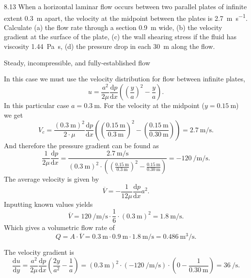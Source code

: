 \begin{problem}{8.13}
  When a horizontal laminar flow occurs between two parallel plates of infinite extent \qty{0,3}{\m} apart, the velocity at the midpoint between the plates is \qty{2,7}{\m\per\s}. Calculate (a) the flow rate through a section \qty{0,9}{\m} wide, (b) the velocity gradient at the surface of the plate, (c) the wall shearing stress if the fluid has viscosity \qty{1,44}{\Pa.\s}, (d) the pressure drop in each \qty{30}{\m} along the flow. 
\end{problem}

\begin{assumptions}
  \item Steady, incompressible, and fully-established flow
\end{assumptions}

\begin{derivation}
  In this case we must use the velocity distribution for flow between infinite plates,
  \[ 
  u = \frac{a^2}{2\mu} \frac{\mathrm{d}p}{\mathrm{d}x} \left( \left( \frac{y}{a} \right)^2 - \frac{y}{a} \right)
  .\]
  In this particular case $a = \qty{0,3}{\m}$.
  For the velocity at the midpoint ($y = \qty{0,15}{\m}$) we get
  \[ 
  V_c = \frac{\left( \qty{0,3}{\m}  \right)^2}{2 \cdot \mu} \frac{\mathrm{d}p}{\mathrm{d}x}  \left( \left( \frac{\qty{0,15}{\m} }{\qty{0,3}{\m} } \right)^2 - \left( \frac{\qty{0,15}{\m} }{\qty{0,30}{\m} } \right) \right) = \qty{2,7}{\m\per\s} 
  .\]
  And therefore the pressure gradient can be found as
  \[ 
    \frac{1}{2\mu}\frac{\mathrm{d}p}{\mathrm{d}x} = \frac{\qty{2,7}{\m\per\s}}{\left( \qty{0,3}{\m}  \right)^2 \cdot \left( \left( \frac{\qty{0,15}{\m} }{\qty{0,3}{\m} } \right)^2 - \frac{\qty{0,15}{\m} }{\qty{0,30}{\m} } \right)} = \qty{-120}{\per\m\per\s} 
  .\]
  The average velocity is given by
  \[ 
  \overline{V} = - \frac{1}{12\mu} \frac{\mathrm{d}p}{\mathrm{d}x} a^2
  .\]
  Inputting known values yields
  \[ 
  \overline{V} = \qty{120}{\per\m\per\s} \cdot \frac{1}{6} \cdot \left( \qty{0,3}{\m}  \right)^2 = \qty{1,8}{\m\per\s} 
  .\]
  Which gives a volumetric flow rate of
  \[ 
  Q = A \cdot \overline{V} = \qty{0,3}{\m} \cdot \qty{0,9}{\m} \cdot \qty{1,8}{\m\per\s}  = \qty{0,486}{\cubic\m\per\s} 
  .\]
  
  The velocity gradient is
  \[ 
  \frac{\mathrm{d}u}{\mathrm{d}y} = \frac{a^2}{2\mu} \frac{\mathrm{d}p}{\mathrm{d}x} \left( \frac{2y}{a^2} - \frac{1}{a} \right) = \left( \qty{0,3}{\m}  \right)^2 \cdot \left( \qty{-120}{\per\m\per\s} \right) \cdot \left( 0 - \frac{1}{\qty{0,30}{\m} } \right) = \qty{36}{\per\s} 
  .\]


\end{derivation}
